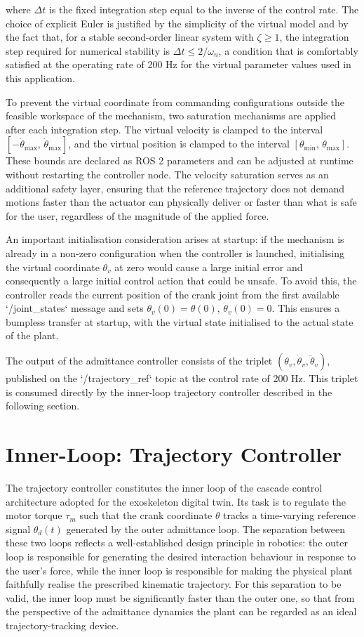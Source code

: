 where $\Delta t$ is the fixed integration step equal to the inverse of the control rate. The choice of explicit Euler is justified by the simplicity of the virtual model and by the fact that, for a stable second-order linear system with $\zeta \ge 1$, the integration step required for numerical stability is $\Delta t \le 2/\omega_n$, a condition that is comfortably satisfied at the operating rate of 200 Hz for the virtual parameter values used in this application.
 
To prevent the virtual coordinate from commanding configurations outside the feasible workspace of the mechanism, two saturation mechanisms are applied after each integration step. The virtual velocity is clamped to the interval $[-\dot\theta_{\max},\,\dot\theta_{\max}]$, and the virtual position is clamped to the interval $[\theta_{\min},\,\theta_{\max}]$. These bounds are declared as ROS 2 parameters and can be adjusted at runtime without restarting the controller node. The velocity saturation serves as an additional safety layer, ensuring that the reference trajectory does not demand motions faster than the actuator can physically deliver or faster than what is safe for the user, regardless of the magnitude of the applied force.
 
An important initialisation consideration arises at startup: if the mechanism is already in a non-zero configuration when the controller is launched, initialising the virtual coordinate $\theta_v$ at zero would cause a large initial error and consequently a large initial control action that could be unsafe. To avoid this, the controller reads the current position of the crank joint from the first available `/joint\_states` message and sets $\theta_v(0) = \theta(0)$, $\dot\theta_v(0) = 0$. This ensures a bumpless transfer at startup, with the virtual state initialised to the actual state of the plant.
 
The output of the admittance controller consists of the triplet $(\theta_v, \dot\theta_v, \ddot\theta_v)$, published on the `/trajectory\_ref` topic at the control rate of 200 Hz. This triplet is consumed directly by the inner-loop trajectory controller described in the following section.

\section{Inner-Loop: Trajectory Controller}
The trajectory controller constitutes the inner loop of the cascade control architecture adopted for the exoskeleton digital twin. Its task is to regulate the motor torque $\tau_m$ such that the crank coordinate $\theta$ tracks a time-varying reference signal $\theta_d(t)$ generated by the outer admittance loop. The separation between these two loops reflects a well-established design principle in robotics: the outer loop is responsible for generating the desired interaction behaviour in response to the user's force, while the inner loop is responsible for making the physical plant faithfully realise the prescribed kinematic trajectory. For this separation to be valid, the inner loop must be significantly faster than the outer one, so that from the perspective of the admittance dynamics the plant can be regarded as an ideal trajectory-tracking device.
 
